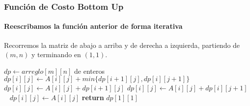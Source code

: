\documentclass[spanish]{beamer}
\begin{document}
    \begin{frame}
        \frametitle{Función de Costo Bottom Up}
        \framesubtitle{Reescribamos la función anterior de forma iterativa}

        Recorremos la matriz de abajo a arriba y de derecha a izquierda, partiendo de $(m,n)$ y terminando en $(1, 1)$.

        \vspace{1em}

        \small{
            \begin{algorithmic}
                    \State $dp \leftarrow arreglo[m][n]$ de enteros
                             
                                \State $dp[i][j] \leftarrow A[i][j] + min\{ dp[i+1][j], dp[i][j+1] \}$
                             
                                \State $dp[i][j] \leftarrow A[i][j] + dp[i+1][j]$
                             
                                \State $dp[i][j] \leftarrow A[i][j] + dp[i][j+1]$
                            \Else \mbox{ } $dp[i][j] \leftarrow A[i][j]$  
                            \EndIf
                        \EndFor
                    \EndFor
                    \State \textbf{return} $dp[1][1]$
                \EndProcedure
            \end{algorithmic}
        }
    \end{frame}
\end{document}

